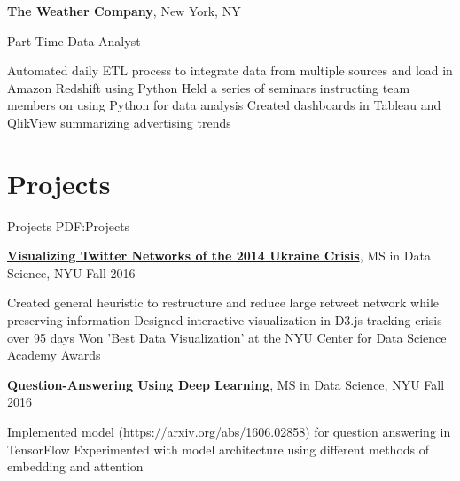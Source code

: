 \documentclass[letterpaper,9.5pt,oneside]{article}
\begin{document}
\begin{body}
\BigGap

\textbf{The Weather Company},
New York, NY

\GapNoBreak
Part-Time Data Analyst
\hfill
{} --
\begin{detail}
\BulletItem
Automated daily ETL process to integrate data from multiple sources and load in Amazon Redshift using Python
\BulletItem Held a series of seminars instructing team members on using Python for data analysis
\BulletItem Created dashboards in Tableau and QlikView summarizing advertising trends
\end{detail}

\BigGap



\section
{Projects}
{Projects}
{PDF:Projects}

\href{http://cims.nyu.edu/~ceb545/LaSNe/viz/graph_line.html}
{\textbf{Visualizing Twitter Networks of the 2014 Ukraine Crisis}},
MS in Data Science, NYU \hfill
Fall 2016

\GapNoBreak
\begin{detail}
\BulletItem
Created general heuristic to restructure and reduce large retweet network while preserving information
\BulletItem Designed interactive visualization in D3.js tracking crisis over 95 days 
\BulletItem Won 'Best Data Visualization' at the NYU Center for Data Science Academy Awards
\end{detail}

\BigGap

\textbf{Question-Answering Using Deep Learning},
MS in Data Science, NYU \hfill
Fall 2016

\GapNoBreak
\begin{detail}
\BulletItem
Implemented model (\url{https://arxiv.org/abs/1606.02858}) for question answering in TensorFlow
\BulletItem Experimented with model architecture using different methods of embedding and attention
\end{detail}


\end{body}
\end{document}
